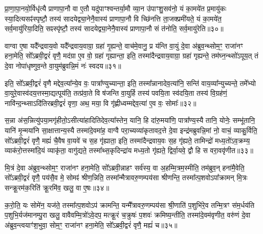 प्रा॒णा॒पा॒नयो॒र्विधृ॑त्यै प्राणापा॒नौ वा ए॒तौ यदु॑पाꣳश्वन्तर्या॒मौ व्या॒न उ॑पाꣳशु॒सव॑नो॒ यं का॒मये॑त प्र॒मायु॑कः स्या॒दित्यसꣴ॑स्पृष्टौ॒ तस्य॑ सादयेद्व्या॒नेनै॒वास्य॑ प्राणापा॒नौ वि च्छि॑नत्ति ता॒जक्प्रमी॑यते॒ यं का॒मये॑त॒ सर्व॒मायु॑रिया॒दिति॒ सꣴस्पृ॑ष्टौ॒ तस्य॑ सादयेद्व्या॒नेनै॒वास्य॑ प्राणापा॒नौ सं त॑नोति॒ सर्व॒मायु॑रेति॥३०॥

{\anuvakamend[{त॒ उ॒भया᳚न्गृह्यते॒ चतु॑श्चत्वारिꣳशच्च॥६॥}]}

वाग्वा ए॒षा यदै᳚न्द्रवाय॒वो यदै᳚न्द्रवाय॒वाग्रा॒ ग्रहा॑ गृ॒ह्यन्ते॒ वाच॑मे॒वानु॒ प्र य॑न्ति वा॒युं दे॒वा अ॑ब्रुव॒न्थ्सोम॒ꣳ॒ राजा॑नꣳ हना॒मेति॒ सो᳚\-ऽब्रवी॒द्वरं॑ वृणै॒ मद॑ग्रा ए॒व वो॒ ग्रहा॑ गृह्यान्ता॒ इति॒ तस्मा॑दैन्द्रवाय॒वाग्रा॒ ग्रहा॑ गृह्यन्ते॒ तम॑घ्न॒न्थ्सो॑\-ऽपूय॒त् तं दे॒वा नोपा॑धृष्णुव॒न्ते वा॒युम॑ब्रुवन्नि॒मं नः॑ स्वदय॥३१॥

इति॒ सो᳚\-ऽब्रवी॒द्वरं॑ वृणै मद्देव॒त्या᳚न्ये॒व वः॒ पात्रा᳚ण्युच्यान्ता॒ इति॒ तस्मा᳚न्नानादेव॒त्या॑नि॒ सन्ति॑ वाय॒व्या᳚न्युच्यन्ते॒ तमे᳚भ्यो वा॒युरे॒वास्व॑दय॒त्तस्मा॒द्यत्पूय॑ति॒ तत्प्र॑वा॒ते वि ष॑जन्ति वा॒युर्\mbox{}हि तस्य॑ पवयि॒ता स्व॑दयि॒ता तस्य॑ वि॒ग्रह॑णं॒ नावि॑न्द॒न्थ्सा\-ऽदि॑तिरब्रवी॒द्वरं॑ वृणा॒ अथ॒ मया॒ वि गृ॑ह्णीध्वम्मद्देव॒त्या॑ ए॒व वः॒ सोमाः᳚॥३२॥

स॒न्ना अ॑स॒न्नित्यु॑पया॒मगृ॑हीतो॒\-ऽसीत्या॑हादितिदेव॒त्या᳚स्तेन॒ यानि॒ हि दा॑रु॒मया॑णि॒ पात्रा᳚ण्य॒स्यै तानि॒ योनेः॒ सम्भू॑तानि॒ यानि॑ मृ॒न्मया॑नि सा॒क्षात्तान्य॒स्यै तस्मा॑दे॒वमा॑ह॒ वाग्वै परा॒च्यव्या॑कृतावद॒त्ते दे॒वा इन्द्र॑मब्रुवन्नि॒मां नो॒ वाचं॒ व्याकु॒र्विति॒ सो᳚\-ऽब्रवी॒द्वरं॑ वृणै॒ मह्यं॑ चै॒वैष वा॒यवे॑ च स॒ह गृ॑ह्याता॒ इति॒ तस्मा॑दैन्द्रवाय॒वः स॒ह गृ॑ह्यते॒ तामिन्द्रो॑ मध्य॒तो॑\-ऽव॒क्रम्य॒ व्याक॑रो॒त्तस्मा॑दि॒यं व्याकृ॑ता॒ वागु॑द्यते॒ तस्मा᳚थ्स॒कृदिन्द्रा॑य मध्य॒तो गृ॑ह्यते॒ द्विर्वा॒यवे॒ द्वौ हि स वरा॒ववृ॑णीत॥३३॥

{\anuvakamend[{स्व॒द॒य॒ सोमाः᳚ स॒हाष्टाविꣳ॑शतिश्च॥७॥}]}

मि॒त्रं दे॒वा अ॑ब्रुव॒न्थ्सोम॒ꣳ॒ राजा॑नꣳ हना॒मेति॒ सो᳚\-ऽब्रवी॒न्नाहꣳ सर्व॑स्य॒ वा अ॒हम्मि॒त्रम॒स्मीति॒ तम॑ब्रुव॒न् हना॑मै॒वेति॒ सो᳚\-ऽब्रवी॒द्वरं॑ वृणै॒ पय॑सै॒व मे॒ सोमꣴ॑ श्रीण॒न्निति॒ तस्मा᳚न्मैत्रावरु॒णम्पय॑सा श्रीणन्ति॒ तस्मा᳚त्प॒शवो\-ऽपा᳚क्रामन् मि॒त्रः सन्क्रू॒रम॑क॒रिति॑ क्रू॒रमि॑व॒ खलु॒ वा ए॒षः॥३४॥

क॒रो॒ति॒ यः सोमे॑न॒ यज॑ते॒ तस्मा᳚त्प॒शवो\-ऽप॑ क्रामन्ति॒ यन्मै᳚त्रावरु॒णम्पय॑सा श्री॒णाति॑ प॒शुभि॑रे॒व तन्मि॒त्रꣳ स॑म॒र्धय॑ति प॒शुभि॒र्यज॑मानम्पु॒रा खलु॒ वावैवम्मि॒त्रो॑\-ऽवे॒दप॒ मत्क्रू॒रं च॒क्रुषः॑ प॒शवः॑ क्रमिष्य॒न्तीति॒ तस्मा॑दे॒वम॑वृणीत॒ वरु॑णं दे॒वा अ॑ब्रुव॒न्त्वयाꣳ॑श॒भुवा॒ सोम॒ꣳ॒ राजा॑नꣳ हना॒मेति॒ सो᳚\-ऽब्रवी॒द्वरं॑ वृणै॒ मह्यं॑ च॥३५॥

